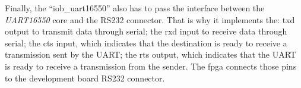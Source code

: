 \begin{table}[!ht]
  \centering
  \caption{\textit{UART16550} interface with \textit{IOb-SoC}.}
  \label{tab:wishbone_iob_soc}
\end{table}

Finally, the \enquote{iob\_uart16550} also has to pass the interface between the \textit{UART16550} core and the RS232 connector. That is why it implements the: txd output to transmit data through serial; the rxd input to receive data through serial; the cts input, which indicates that the destination is ready to receive a transmission sent by the UART; the rts output, which indicates that the UART is ready to receive a transmission from the sender. The \acrshort{fpga} connects those pins to the development board RS232 connector.

